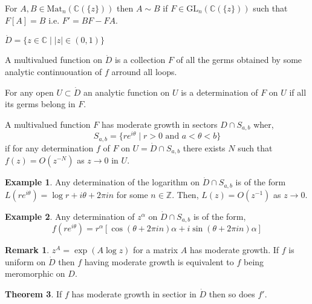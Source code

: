 \documentclass[12pt]{extarticle}
\newcommand{\Z}{\mathbb{Z}}
\newcommand{\C}{\mathbb{C}}
\theoremstyle{definition}
\newtheorem{theorem}{Theorem}[section]
\newtheorem{example}[theorem]{Example}
\newtheorem{remark}{Remark}
\newenvironment{definition}[1][Definition:]{\begin{trivlist}
\item[\hskip \labelsep {\bfseries #1}]}{\end{trivlist}}
\newcommand{\GL}[2]{\mathrm{GL}_{#1}\left( #2 \right)}
\begin{document}
\begin{definition}
For $A, B \in \mathrm{Mat}_n(\C(\{ z\}))$ then $A \sim B$ if $F \in \GL{n}{\C(\{z \})}$ such that $F[A] = B$ i.e. $F' = BF - FA$.
\end{definition}

\begin{definition}
$\dot{D} = \{ z \in \C \mid |z| \in (0,1) \}$ 
\end{definition}

\begin{definition}
A multivalued function on $\dot{D}$ is a collection $F$ of all the germs obtained by some analytic continuouation of $f$ arround all loops.
\end{definition}

\begin{definition}
For any open $U \subset \dot{D}$ an analytic function on $U$ is a determination of $F$ on $U$ if all its germs belong in $F$.
\end{definition}

\begin{definition}
A multivalued function $F$ has moderate growth in sectors $D \cap S_{a,b}$ wher,
\[ S_{a,b} = \{ re^{i \theta} \mid r > 0 \text{ and } a < \theta < b \} \]
if for any determination $f$ of $F$ on $U = \dot{D} \cap S_{a,b}$ there exists $N$ such that $f(z) = O(z^{-N})$ as $z \to 0$ in $U$. 
\end{definition}

\begin{example}
Any determination of the logarithm on $\dot{D} \cap S_{a,b}$ is of the form $L(r e^{i \theta}) = \log{r} + i \theta + 2 \pi i n$ for some $n \in \Z$. Then, $L(z)  = O(z^{-1})$ as $z \to 0$. 
\end{example}

\begin{example}
Any determination of $z^\alpha$ on $\dot{D} \cap S_{a,b}$ is of the form, 
\[ f(r e^{i \theta}) = r^\alpha \left[ \cos{(\theta + 2 \pi i n) \alpha} + i \sin{(\theta + 2 \pi i n) \alpha} \right] \]
\end{example}

\begin{remark}
$z^A = \exp(A \log{z})$ for a matrix $A$ has moderate growth. If $f$ is uniform on $\dot{D}$ then $f$ having moderate growth is equivalent to $f$ being meromorphic on $D$. 
\end{remark}

\begin{theorem}
If $f$ has moderate growth in sectior in $\dot{D}$ then so does $f'$. 
\end{theorem}
\end{document}
